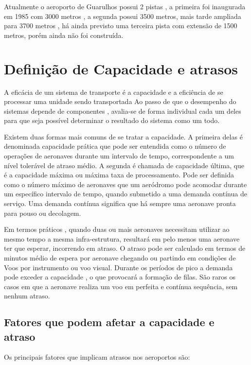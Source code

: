 \documentclass[12pt]{article}
\begin{document}
Atualmente o aeroporto de Guarulhos possui 2 pistas , a primeira foi 
inaugurada em 1985 com  3000 metros , a segunda possui 3500 metros, 
mais tarde ampliada para 3700 metros , há ainda previsto uma terceira
pista com extensão de 1500 metros, porém ainda não foi construída. 


\section{Definição de Capacidade e atrasos}

A eficácia de um sistema de transporte é a capacidade e a eficiência de
se processar uma unidade sendo transportada Ao passo de que o desempenho
do sistemas depende de componentes , avalia-se de forma individual cada
um deles para que seja possível determinar o resultado do sistema como 
um todo. 

Existem duas formas mais comuns de se tratar a capacidade. A primeira delas
é denominada capacidade prática que pode ser entendida como o número de 
operações de aeronaves durante um intervalo de tempo, correspondente a um
nível tolerável de atraso médio. A segunda é chamada de capacidade última,
que é a capacidade máxima ou máxima taxa de processamento. Pode ser 
definida como o número máximo de aeronaves que um aeródromo pode acomodar
durante um específico intervalo de tempo, quando submetido a uma demanda
contínua de serviço. Uma demanda contínua significa que há sempre uma 
aeronave pronta para pouso ou decolagem. 

Em termos práticos , quando duas ou mais aeronaves necessitam utilizar ao
mesmo tempo a mesma infra-estrutura, resultará em pelo menos uma aeronave 
ter que esperar, incorrendo em atraso. O atraso pode ser calculado em termos
de minutos médio de espera por aeronave chegando ou partindo em condições 
de Voos por instrumento ou voo visual. Durante os períodos de pico a demanda
pode exceder a capacidade , o que provocará a formação de filas. São raros
os casos em que a aeronave realiza um voo em perfeita e contínua sequência,
sem nenhum atraso. 

\subsection{Fatores que podem afetar a capacidade e atraso}

Os principais fatores que implicam atrasos nos aeroportos são:

\end{document}
